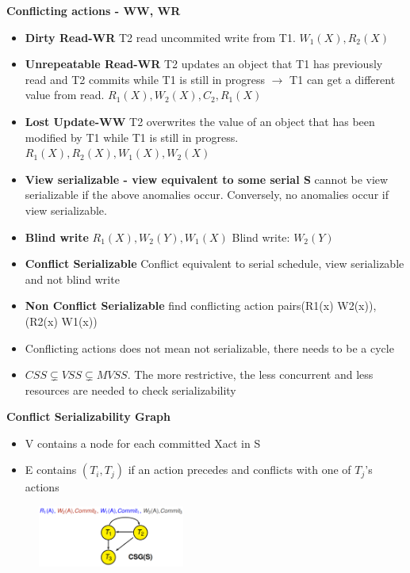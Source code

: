 \documentclass[10pt, landscape]{article}
\begin{document}
\begin{multicols}{4}
\textbf{Conflicting actions - WW, WR} \\
\begin{itemize}
  \item \textbf{Dirty Read-WR} T2 read uncommited write from T1. $W_1(X), R_2(X)$
  \item \textbf{Unrepeatable Read-WR} T2 updates an object that T1 has previously read and T2 commits while T1 is still in progress $\rightarrow$ T1 can get a different value from read. $R_1(X), W_2(X), C_2, R_1(X)$
  \item \textbf{Lost Update-WW} T2 overwrites the value of an object that has been modified by T1 while T1 is still in progress. $R_1(X), R_2(X), W_1(X), W_2(X)$
  \item \textbf{View serializable - view equivalent to some serial S} cannot be view serializable if the above anomalies occur. Conversely, no anomalies occur if view serializable.
  \item \textbf{Blind write} $R_1(X), W_2(Y) , W_1(X)$ Blind write: $W_2(Y)$
  \item \textbf{Conflict Serializable} Conflict equivalent to serial schedule, view serializable and not blind write
  \item \textbf{Non Conflict Serializable} find conflicting action pairs(R1(x) W2(x)), (R2(x) W1(x))  
  \item Conflicting actions does not mean not serializable, there needs to be a cycle
  \item \textbf{$CSS \subsetneq VSS \subsetneq MVSS$}. The more restrictive, the less concurrent and less resources are needed to check serializability
\end{itemize}

\textbf{Conflict Serializability Graph} \\
\begin{itemize}
  \item V contains a node for each committed Xact in S
  \item E contains $(T_i, T_j)$ if an action precedes and conflicts with one of $T_j$'s actions
\end{itemize}
\includegraphics[width=7cm, height =2cm]{csg.png}



\end{multicols}
\end{document}
